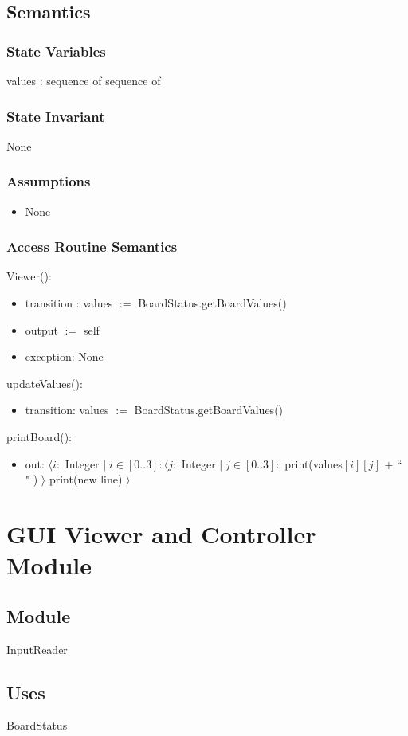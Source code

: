 \documentclass{article}
\begin{document}
\subsection*{Semantics}
\subsubsection*{State Variables}
values : sequence of sequence of 
\subsubsection*{State Invariant}
None
\subsubsection*{Assumptions}
\begin{itemize}
    \item None
\end{itemize}

\subsubsection*{Access Routine Semantics}
Viewer():
\begin{itemize}
    \item transition : values $:=$ BoardStatus.getBoardValues()
    \item output $:=$ self
    \item exception: None
\end{itemize}
updateValues():
\begin{itemize}
    \item transition: values $:=$ BoardStatus.getBoardValues()
\end{itemize}
printBoard():
\begin{itemize}
    \item out: $\langle i :$ Integer $ |\; i \in [0..3] : \langle j : $ Integer $ |\; j \in [0..3]: $ print(values$[i][j]$ + `` " ) $\rangle$ print(new line) $\rangle$
\end{itemize}

\newpage
\section*{GUI Viewer and Controller Module}
\subsection*{Module}
InputReader
\subsection*{Uses}
BoardStatus
\end{document}
